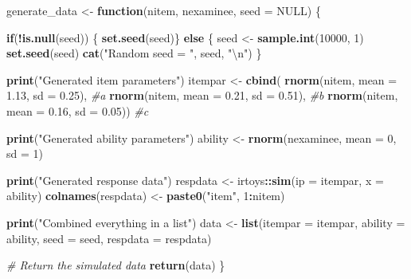 \documentclass[
]{book}
\newenvironment{Shaded}{\begin{snugshade}}{\end{snugshade}}
\newcommand{\CharTok}[1]{\textcolor[rgb]{0.31,0.60,0.02}{#1}}
\newcommand{\CommentTok}[1]{\textcolor[rgb]{0.56,0.35,0.01}{\textit{#1}}}
\newcommand{\ControlFlowTok}[1]{\textcolor[rgb]{0.13,0.29,0.53}{\textbf{#1}}}
\newcommand{\DataTypeTok}[1]{\textcolor[rgb]{0.13,0.29,0.53}{#1}}
\newcommand{\DecValTok}[1]{\textcolor[rgb]{0.00,0.00,0.81}{#1}}
\newcommand{\FloatTok}[1]{\textcolor[rgb]{0.00,0.00,0.81}{#1}}
\newcommand{\KeywordTok}[1]{\textcolor[rgb]{0.13,0.29,0.53}{\textbf{#1}}}
\newcommand{\NormalTok}[1]{#1}
\newcommand{\OperatorTok}[1]{\textcolor[rgb]{0.81,0.36,0.00}{\textbf{#1}}}
\newcommand{\OtherTok}[1]{\textcolor[rgb]{0.56,0.35,0.01}{#1}}
\newcommand{\StringTok}[1]{\textcolor[rgb]{0.31,0.60,0.02}{#1}}
\begin{document}
\begin{Shaded}
\begin{Highlighting}[]
\NormalTok{generate_data <-}\StringTok{ }\ControlFlowTok{function}\NormalTok{(nitem, nexaminee, }\DataTypeTok{seed =} \OtherTok{NULL}\NormalTok{) \{}
  
  \ControlFlowTok{if}\NormalTok{(}\OperatorTok{!}\KeywordTok{is.null}\NormalTok{(seed)) \{}
    \KeywordTok{set.seed}\NormalTok{(seed)\} }
  \ControlFlowTok{else}\NormalTok{ \{}
\NormalTok{    seed <-}\StringTok{ }\KeywordTok{sample.int}\NormalTok{(}\DecValTok{10000}\NormalTok{, }\DecValTok{1}\NormalTok{)}
    \KeywordTok{set.seed}\NormalTok{(seed)}
    \KeywordTok{cat}\NormalTok{(}\StringTok{"Random seed = "}\NormalTok{, seed, }\StringTok{"}\CharTok{\textbackslash{}n}\StringTok{"}\NormalTok{)}
\NormalTok{  \}}
  
  \KeywordTok{print}\NormalTok{(}\StringTok{"Generated item parameters"}\NormalTok{)}
\NormalTok{  itempar <-}\StringTok{ }\KeywordTok{cbind}\NormalTok{(}
    \KeywordTok{rnorm}\NormalTok{(nitem, }\DataTypeTok{mean =} \FloatTok{1.13}\NormalTok{, }\DataTypeTok{sd =} \FloatTok{0.25}\NormalTok{), }\CommentTok{#a}
    \KeywordTok{rnorm}\NormalTok{(nitem, }\DataTypeTok{mean =} \FloatTok{0.21}\NormalTok{, }\DataTypeTok{sd =} \FloatTok{0.51}\NormalTok{), }\CommentTok{#b}
    \KeywordTok{rnorm}\NormalTok{(nitem, }\DataTypeTok{mean =} \FloatTok{0.16}\NormalTok{, }\DataTypeTok{sd =} \FloatTok{0.05}\NormalTok{)) }\CommentTok{#c}
  
  \KeywordTok{print}\NormalTok{(}\StringTok{"Generated ability parameters"}\NormalTok{)}
\NormalTok{  ability <-}\StringTok{ }\KeywordTok{rnorm}\NormalTok{(nexaminee, }\DataTypeTok{mean =} \DecValTok{0}\NormalTok{, }\DataTypeTok{sd =} \DecValTok{1}\NormalTok{)}
  
  \KeywordTok{print}\NormalTok{(}\StringTok{"Generated response data"}\NormalTok{)}
\NormalTok{  respdata <-}\StringTok{ }\NormalTok{irtoys}\OperatorTok{::}\KeywordTok{sim}\NormalTok{(}\DataTypeTok{ip =}\NormalTok{ itempar, }\DataTypeTok{x =}\NormalTok{ ability)}
  \KeywordTok{colnames}\NormalTok{(respdata) <-}\StringTok{ }\KeywordTok{paste0}\NormalTok{(}\StringTok{"item"}\NormalTok{, }\DecValTok{1}\OperatorTok{:}\NormalTok{nitem)}
  
  \KeywordTok{print}\NormalTok{(}\StringTok{"Combined everything in a list"}\NormalTok{)}
\NormalTok{  data <-}\StringTok{ }\KeywordTok{list}\NormalTok{(}\DataTypeTok{itempar =}\NormalTok{ itempar,}
               \DataTypeTok{ability =}\NormalTok{ ability,}
               \DataTypeTok{seed =}\NormalTok{ seed,}
               \DataTypeTok{respdata =}\NormalTok{ respdata)}
  
  \CommentTok{# Return the simulated data}
  \KeywordTok{return}\NormalTok{(data)}
\NormalTok{\}}
\end{Highlighting}
\end{Shaded}
\end{document}
